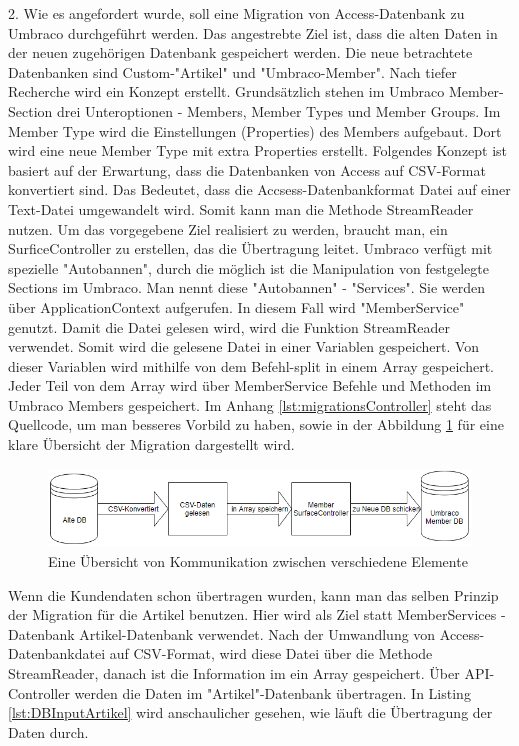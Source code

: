 2. Wie es angefordert wurde, soll eine Migration von Access-Datenbank zu Umbraco durchgeführt werden. Das angestrebte Ziel ist, dass die alten Daten in der neuen zugehörigen Datenbank gespeichert werden. Die neue betrachtete Datenbanken sind Custom-"Artikel" und "Umbraco-Member". 
Nach tiefer Recherche wird ein Konzept erstellt. 
Grundsätzlich stehen im Umbraco Member-Section \cite{OurUmbraco2018} drei Unteroptionen - Members, Member Types und Member Groups.
Im Member Type wird die Einstellungen (Properties) des Members aufgebaut. Dort wird eine neue Member Type mit extra Properties erstellt. 
Folgendes Konzept ist basiert auf der Erwartung, dass die Datenbanken von Access auf CSV-Format konvertiert sind. Das Bedeutet, dass die Accsess-Datenbankformat Datei auf einer Text-Datei umgewandelt wird. Somit kann man die Methode StreamReader nutzen.
Um das vorgegebene Ziel realisiert zu werden, braucht man, ein SurficeController zu erstellen, das die Übertragung leitet. 
Umbraco verfügt mit spezielle "Autobannen", durch die möglich ist die Manipulation von festgelegte Sections im Umbraco. Man nennt diese "Autobannen" - "Services". Sie werden über ApplicationContext aufgerufen. In diesem Fall wird "MemberService" genutzt.
Damit die Datei gelesen wird, wird die Funktion StreamReader verwendet. Somit wird die gelesene Datei in einer Variablen gespeichert. Von dieser Variablen wird mithilfe von dem Befehl-split in einem Array gespeichert. Jeder Teil von dem Array wird über MemberService Befehle und Methoden im Umbraco Members gespeichert. Im Anhang \ref{lst:migrationsController} steht das Quellcode, um man besseres Vorbild zu haben, sowie in der Abbildung \ref{fig:DBMigration} für eine klare Übersicht der Migration dargestellt wird.

 \begin{figure}[h]
	\centering
	\includegraphics[width=1\linewidth]{Graphics/DBMigration.png}
	\caption[Shop]{Eine Übersicht von Kommunikation zwischen verschiedene Elemente}
	\label{fig:DBMigration}
\end{figure}

Wenn die Kundendaten schon übertragen wurden, kann man das selben Prinzip der Migration für die Artikel benutzen. Hier wird als Ziel statt MemberServices - Datenbank Artikel-Datenbank  verwendet. Nach der Umwandlung von Access-Datenbankdatei auf CSV-Format, wird diese Datei über die Methode StreamReader, danach ist die Information im ein Array gespeichert. Über API-Controller werden die Daten im "Artikel"-Datenbank übertragen. In Listing \ref{lst:DBInputArtikel} wird anschaulicher gesehen, wie läuft die Übertragung der Daten durch. 

